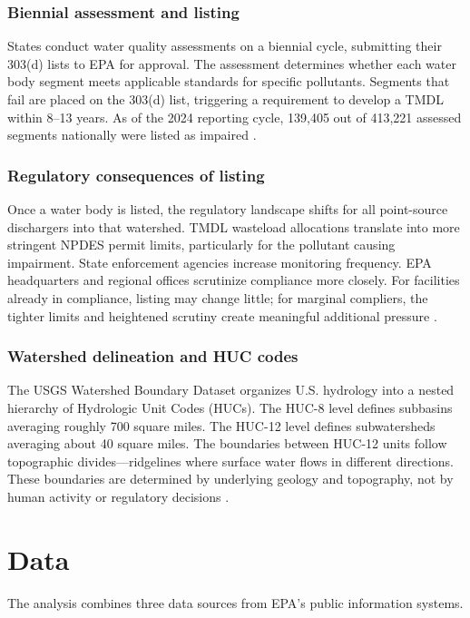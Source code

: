 \documentclass[12pt]{article}
\begin{document}
\subsubsection*{Biennial assessment and listing} States conduct water quality assessments on a biennial cycle, submitting their 303(d) lists to EPA for approval. The assessment determines whether each water body segment meets applicable standards for specific pollutants. Segments that fail are placed on the 303(d) list, triggering a requirement to develop a TMDL within 8--13 years. As of the 2024 reporting cycle, 139,405 out of 413,221 assessed segments nationally were listed as impaired \citep{epa2024ir}.

\subsubsection*{Regulatory consequences of listing} Once a water body is listed, the regulatory landscape shifts for all point-source dischargers into that watershed. TMDL wasteload allocations translate into more stringent NPDES permit limits, particularly for the pollutant causing impairment. State enforcement agencies increase monitoring frequency. EPA headquarters and regional offices scrutinize compliance more closely. For facilities already in compliance, listing may change little; for marginal compliers, the tighter limits and heightened scrutiny create meaningful additional pressure \citep{sigman2005transboundary}.

\subsubsection*{Watershed delineation and HUC codes} The USGS Watershed Boundary Dataset organizes U.S. hydrology into a nested hierarchy of Hydrologic Unit Codes (HUCs). The HUC-8 level defines subbasins averaging roughly 700 square miles. The HUC-12 level defines subwatersheds averaging about 40 square miles. The boundaries between HUC-12 units follow topographic divides---ridgelines where surface water flows in different directions. These boundaries are determined by underlying geology and topography, not by human activity or regulatory decisions \citep{usgs2024wbd}.


\section{Data}

The analysis combines three data sources from EPA's public information systems.
\end{document}
